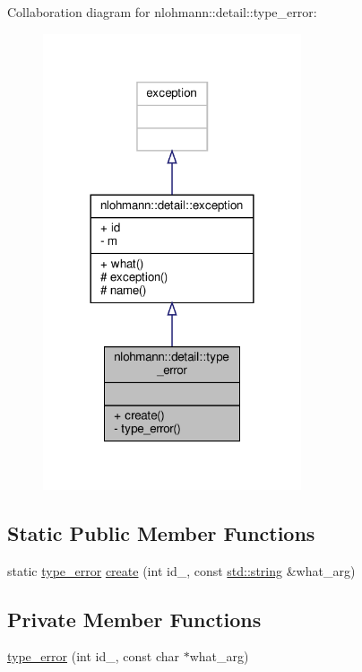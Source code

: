 Collaboration diagram for nlohmann\+:\+:detail\+:\+:type\+\_\+error\+:
\nopagebreak
\begin{figure}[H]
\begin{center}
\leavevmode
\includegraphics[width=216pt]{classnlohmann_1_1detail_1_1type__error__coll__graph}
\end{center}
\end{figure}
\subsection*{Static Public Member Functions}
\begin{DoxyCompactItemize}
\item 
static \hyperlink{classnlohmann_1_1detail_1_1type__error}{type\+\_\+error} \hyperlink{classnlohmann_1_1detail_1_1type__error_aecc083aea4b698c33d042670ba50c10f}{create} (int id\+\_\+, const \hyperlink{namespacenlohmann_1_1detail_a1ed8fc6239da25abcaf681d30ace4985ab45cffe084dd3d20d928bee85e7b0f21}{std\+::string} \&what\+\_\+arg)
\end{DoxyCompactItemize}
\subsection*{Private Member Functions}
\begin{DoxyCompactItemize}
\item 
\hyperlink{classnlohmann_1_1detail_1_1type__error_aa01edaa0bf18b853368f0b900e485cd7}{type\+\_\+error} (int id\+\_\+, const char $\ast$what\+\_\+arg)
\end{DoxyCompactItemize}
